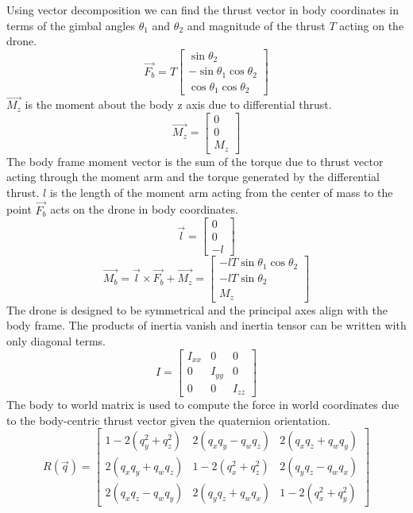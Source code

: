 \documentclass[]{article}
\begin{document}
	Using vector decomposition we can find the thrust vector in body coordinates in terms of the gimbal angles $\theta_1$ and $\theta_2$ and magnitude of the thrust $T$ acting on the drone.
\[
\vec{F_b} = T
\begin{bmatrix}
	\sin{\theta_2}  \\
	-\sin{\theta_1}\cos{\theta_2}  \\
	\cos{\theta_1}\cos{\theta_2}
\end{bmatrix}
\]
$\vec{M_z}$ is the moment about the body z axis due to differential thrust. 
        \[
	\vec{M_z} =
        \begin{bmatrix}
        0  \\
        0  \\
        M_z
        \end{bmatrix}
        \]
The body frame moment vector is the sum of the torque due to thrust vector acting through the moment arm and the torque generated by the differential thrust. $l$ is the length of the moment arm acting from the center of mass to the point $\vec{F_b}$ acts on the drone in body coordinates. 
        \[
	\vec{l} =
        \begin{bmatrix}
        0  \\
        0  \\
        -l
        \end{bmatrix}
        \]
        	 \[
        \vec{M_b} = \vec{l} \times \vec{F_b} + \vec{M_z}=       
        \begin{bmatrix}
        -lT\sin{\theta_1}\cos{\theta_2}  \\
        -lT\sin{\theta_2}  \\
	M_z
        \end{bmatrix}
        \]
The drone is designed to be symmetrical and the principal axes align with the body frame. The products of inertia vanish and inertia tensor can be written with only diagonal terms.
         \[
        I =
        \begin{bmatrix}
        I_{xx} & 0 &0 \\
        0 & I_{yy }& 0 \\
        0 & 0 & I_{zz}
        \end{bmatrix}
        \]
The body to world matrix is used to compute the force in world coordinates due to the body-centric thrust vector given the quaternion orientation.
        \[
        R(\vec{q}) =
        \begin{bmatrix}
        1 - 2(q_y^2 + q_z^2) & 2(q_x q_y - q_w q_z) & 2(q_x q_z + q_w q_y) \\
        2(q_x q_y + q_w q_z) & 1 - 2(q_x^2 + q_z^2) & 2(q_y q_z - q_w q_x) \\
        2(q_x q_z - q_w q_y) & 2(q_y q_z + q_w q_x) & 1 - 2(q_x^2 + q_y^2)
        \end{bmatrix}
        \]
\end{document}
